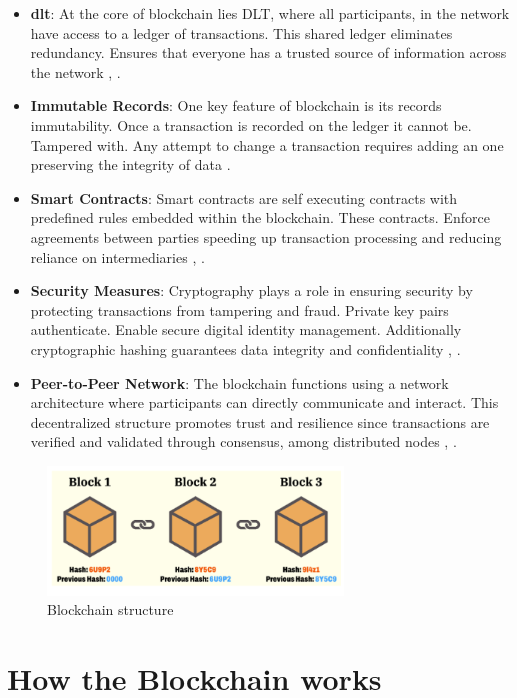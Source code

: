 \begin{itemize}
  \item \textbf{\gls{dlt}}: At the core of blockchain lies DLT, where all participants, in the network have access to a ledger of transactions. 
  This shared ledger eliminates redundancy. Ensures that everyone has a trusted source of information across the network \cite{ibm_blockchain}, \cite{9752154}.
  \item \textbf{Immutable Records}: One key feature of blockchain is its records immutability. Once a transaction is recorded on the ledger it cannot be. Tampered with. 
  Any attempt to change a transaction requires adding an one preserving the integrity of data \cite{ibm_blockchain}.
  \item \textbf{Smart Contracts}: Smart contracts are self executing contracts with predefined rules embedded within the blockchain. These contracts. Enforce agreements 
  between parties speeding up transaction processing and reducing reliance on intermediaries \cite{ibm_blockchain}, \cite{9036241}.
  \item \textbf{Security Measures}:  Cryptography plays a role in ensuring security by protecting transactions from tampering and fraud. Private key pairs authenticate. 
  Enable secure digital identity management. Additionally cryptographic hashing guarantees data integrity and confidentiality \cite{9596538}, \cite{9036241}.
  \item \textbf{Peer-to-Peer Network}: The blockchain functions using a network architecture where participants can directly communicate and interact. This decentralized 
  structure promotes trust and resilience since transactions are verified and validated through consensus, among distributed nodes \cite{9752154}, \cite{9036241}.
\end{itemize}

\begin{figure}[h]  
  \centering
  \includegraphics[width=0.7\textwidth]{Images/c2_1.png} 
  \caption{Blockchain structure}
\end{figure}

\section{How the Blockchain works}

